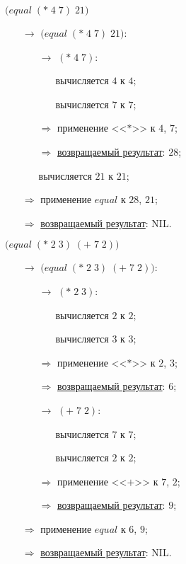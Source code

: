 \problem $\bigl(equal\; (*\; 4\; 7)\; 21\bigr)$

\begin{itemize}
	\item[$\longrightarrow$] $\bigl(equal\; (*\; 4\; 7)\; 21\bigr)$:
	\begin{itemize}
		\item[$\longrightarrow$] $(*\; 4\; 7)$:
		\begin{itemize}
			\item[\textbullet] вычисляется $4$ к $4$;
			\item[\textbullet] вычисляется $7$ к $7$;
		\end{itemize}
		\item[$\Longrightarrow$] применение <<$*$>> к $4$, $7$;
		\item[$\Longrightarrow$] \underline{возвращаемый результат}: $28$;
		\item[\textbullet] вычисляется $21$ к $21$;
	\end{itemize}
	\item[$\Longrightarrow$] применение $equal$ к $28$, $21$;
	\item[$\Longrightarrow$] \underline{возвращаемый результат}: NIL.
\end{itemize}


\newpage
\vfill
\problem $\bigl(equal\; (*\; 2\; 3)\; (+\; 7\; 2) \bigr)$

\begin{itemize}
	\item[$\longrightarrow$] $\bigl(equal\; (*\; 2\; 3)\; (+\; 7\; 2) \bigr)$:
	\begin{itemize}
		\item[$\longrightarrow$] $(*\; 2\; 3)$:
		\begin{itemize}
			\item[\textbullet] вычисляется $2$ к $2$;
			\item[\textbullet] вычисляется $3$ к $3$;
		\end{itemize}
		\item[$\Longrightarrow$] применение <<$*$>> к $2$, $3$;
		\item[$\Longrightarrow$] \underline{возвращаемый результат}: $6$;
		\item[$\longrightarrow$] $(+\; 7\; 2)$:
		\begin{itemize}
			\item[\textbullet] вычисляется $7$ к $7$;
			\item[\textbullet] вычисляется $2$ к $2$;
		\end{itemize}
		\item[$\Longrightarrow$] применение <<$+$>> к $7$, $2$;
		\item[$\Longrightarrow$] \underline{возвращаемый результат}: $9$;
	\end{itemize}
	\item[$\Longrightarrow$] применение $equal$ к $6$, $9$;
	\item[$\Longrightarrow$] \underline{возвращаемый результат}: NIL.
\end{itemize}
\vfill


